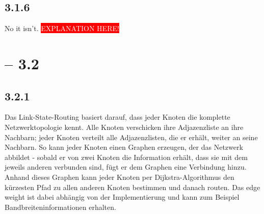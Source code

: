 \documentclass[a4paper,
			llpt,
			solution,
			accentcolor=tud2d,
			colorbacktitle
			]
			{tudexercise}
\newcommand{\8}{$\infty$}
\begin{document}
\subsection{3.1.6}
No it isn't. \colorbox{red}{\textcolor{white}{EXPLANATION HERE!}}
\clearpage
\section{ -- 3.2}
\subsection{3.2.1}
Das Link-State-Routing basiert darauf, dass jeder Knoten die komplette Netzwerktopologie kennt. Alle Knoten verschicken ihre Adjazenzliste an ihre Nachbarn; jeder Knoten verteilt alle Adjazenzlisten, die er erhält, weiter an seine Nachbarn. So kann jeder Knoten einen Graphen erzeugen, der das Netzwerk abbildet - sobald er von zwei Knoten die Information erhält, dass sie mit dem jeweils anderen verbunden sind, fügt er dem Graphen eine Verbindung hinzu. Anhand dieses Graphen kann jeder Knoten per Dijkstra-Algorithmus den kürzesten Pfad zu allen anderen Knoten bestimmen und danach routen. Das edge weight ist dabei abhängig von der Implementierung und kann zum Beispiel Bandbreiteninformationen erhalten.
\end{document}
